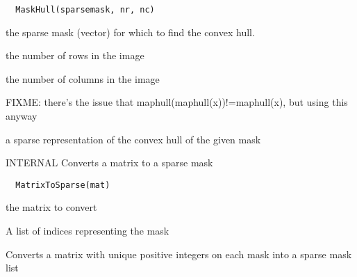 \documentclass[a4paper]{book}
\begin{document}
%
\begin{Usage}
\begin{verbatim}
  MaskHull(sparsemask, nr, nc)
\end{verbatim}
\end{Usage}
%
\begin{Arguments}
\begin{ldescription}
\item[\code{sparsemask}] the sparse mask (vector) for which to
find the convex hull.

\item[\code{nr}] the number of rows in the image

\item[\code{nc}] the number of columns in the image
\end{ldescription}
\end{Arguments}
%
\begin{Details}\relax
FIXME: there's the issue that
maphull(maphull(x))!=maphull(x), but using this anyway
\end{Details}
%
\begin{Value}
a sparse representation of the convex hull of the given
mask
\end{Value}
%
\begin{Description}\relax
INTERNAL Converts a matrix to a sparse mask
\end{Description}
%
\begin{Usage}
\begin{verbatim}
  MatrixToSparse(mat)
\end{verbatim}
\end{Usage}
%
\begin{Arguments}
\begin{ldescription}
\item[\code{mat}] the matrix to convert
\end{ldescription}
\end{Arguments}
%
\begin{Value}
A list of indices representing the mask
\end{Value}
%
\begin{Description}\relax
Converts a matrix with unique positive integers on each
mask into a sparse mask list
\end{Description}
%
\end{document}

